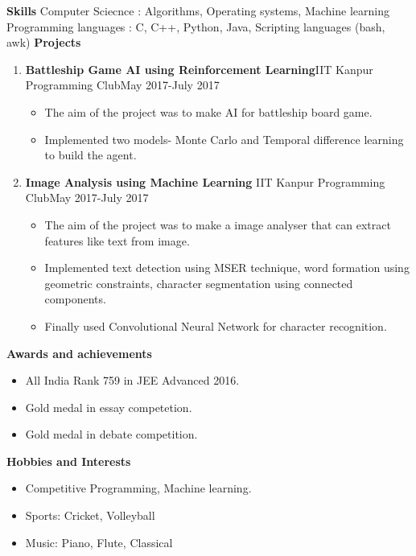 \documentclass{article}
\begin{document}
\newline\newline\newline
\textbf{Skills}\newline\newline
Computer Sciecnce : Algorithms, Operating systems, Machine learning\newline
Programming languages : C, C++, Python, Java, Scripting languages (bash, awk)
\newline\newline
\textbf{Projects}
\begin{enumerate}
   \item \textbf{Battleship Game AI using Reinforcement Learning}\newline                             \footnotesize{IIT Kanpur Programming Club}\hspace{110mm}\footnotesize{May 2017-July 2017}
   	\begin{itemize}
	\item \normalsize{The aim of the project was to make AI for battleship board game.}
	\item \normalsize{Implemented two models- Monte Carlo and Temporal difference learning to build the agent.}
	\end{itemize}
   \item \textbf{\normalsize{Image Analysis using Machine Learning}}\newline
   \footnotesize{IIT Kanpur Programming Club}\hspace{110mm}\footnotesize{May 2017-July 2017}
   	\begin{itemize}
	\item \normalsize{The aim of the project was to make a image analyser that can extract features like text from image.}
	\item \normalsize{Implemented text detection using MSER technique, word formation using geometric constraints, character  segmentation using connected components.}
    \item \normalsize{Finally used Convolutional Neural Network for character recognition.}
	\end{itemize}
\end{enumerate}
\textbf{Awards and achievements}
\renewcommand{\labelitemi}{\textendash}
\begin{itemize}
   \item  All India Rank 759 in JEE Advanced 2016.
   \item  Gold medal in essay competetion.
   \item  Gold medal in debate competition.
\end{itemize}
\textbf{Hobbies and Interests}
\renewcommand{\labelitemi}{\textendash}
\begin{itemize}
   \item  Competitive Programming, Machine learning.	
   \item  Sports: Cricket, Volleyball
   \item  Music: Piano, Flute, Classical
\end{itemize}
\end{document}
